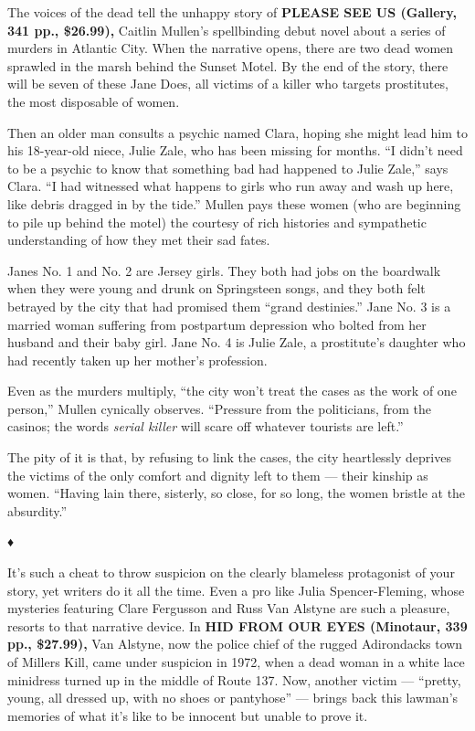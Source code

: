 The voices of the dead tell the unhappy story of \textbf{PLEASE SEE US
(Gallery, 341 pp., \$26.99),} Caitlin Mullen's spellbinding debut novel
about a series of murders in Atlantic City. When the narrative opens,
there are two dead women sprawled in the marsh behind the Sunset Motel.
By the end of the story, there will be seven of these Jane Does, all
victims of a killer who targets prostitutes, the most disposable of
women.

Then an older man consults a psychic named Clara, hoping she might lead
him to his 18-year-old niece, Julie Zale, who has been missing for
months. ``I didn't need to be a psychic to know that something bad had
happened to Julie Zale,'' says Clara. ``I had witnessed what happens to
girls who run away and wash up here, like debris dragged in by the
tide.'' Mullen pays these women (who are beginning to pile up behind the
motel) the courtesy of rich histories and sympathetic understanding of
how they met their sad fates.

Janes No. 1 and No. 2 are Jersey girls. They both had jobs on the
boardwalk when they were young and drunk on Springsteen songs, and they
both felt betrayed by the city that had promised them ``grand
destinies.'' Jane No. 3 is a married woman suffering from postpartum
depression who bolted from her husband and their baby girl. Jane No. 4
is Julie Zale, a prostitute's daughter who had recently taken up her
mother's profession.

Even as the murders multiply, ``the city won't treat the cases as the
work of one person,'' Mullen cynically observes. ``Pressure from the
politicians, from the casinos; the words \emph{serial killer} will scare
off whatever tourists are left.''

The pity of it is that, by refusing to link the cases, the city
heartlessly deprives the victims of the only comfort and dignity left to
them --- their kinship as women. ``Having lain there, sisterly, so
close, for so long, the women bristle at the absurdity.''

♦

It's such a cheat to throw suspicion on the clearly blameless
protagonist of your story, yet writers do it all the time. Even a pro
like Julia Spencer-Fleming, whose mysteries featuring Clare Fergusson
and Russ Van Alstyne are such a pleasure, resorts to that narrative
device. In \textbf{HID FROM OUR EYES (Minotaur, 339 pp., \$27.99),} Van
Alstyne, now the police chief of the rugged Adirondacks town of Millers
Kill, came under suspicion in 1972, when a dead woman in a white lace
minidress turned up in the middle of Route 137. Now, another victim ---
``pretty, young, all dressed up, with no shoes or pantyhose'' --- brings
back this lawman's memories of what it's like to be innocent but unable
to prove it.

